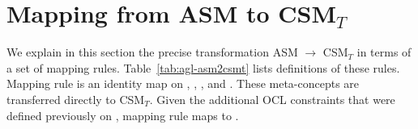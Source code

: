 \section{Mapping from ASM to CSM$_T$} \label{apex:agl-asm2csmt}

We explain in this section the precise transformation ASM $\rightarrow $ CSM$_T$ in terms of a set of mapping rules. Table~\ref{tab:agl-asm2csmt} lists definitions of these rules. 
%
Mapping rule  is an identity map on , , , and . These meta-concepts are transferred directly to CSM$_T$.
%
Given the additional OCL constraints that were defined previously on , mapping rule  maps  to .

